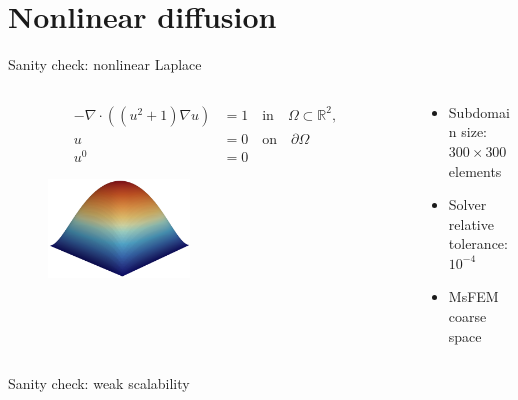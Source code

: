 \section*{Nonlinear diffusion}
\begin{frame}[noframenumbering]{Sanity check: nonlinear Laplace}
    \begin{columns}
        \begin{column}{0.47\textwidth}
                \begin{align*}
                    -\nabla\cdot((u^2+1)\nabla u)&=1\quad \text{in}\quad \Omega\subset\mathbb{R}^2,\\
                    u &= 0\quad\text{on}\quad\partial\Omega\\
                    u^0 &= 0
                \end{align*}
                \begin{figure}
                    \centering
                    \includegraphics[width=0.45\textwidth]{images/laplace}
                \end{figure}
        \end{column}
        \begin{column}{0.53\textwidth}
               \begin{itemize}
                \setlength{\itemsep}{10pt}
                \item Subdomain size: $300\times300$ elements
                \item Solver relative tolerance: $10^{-4}$
                \item MsFEM coarse space
               \end{itemize} 
        \end{column}
    \end{columns}
 \end{frame}
 
 \begin{frame}[noframenumbering]{Sanity check: weak scalability}
  \begin{figure}
      \centering
      
  \end{figure}
 \end{frame}

